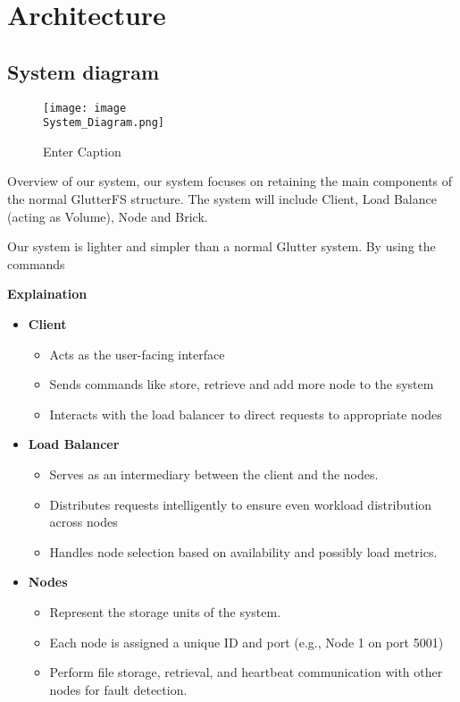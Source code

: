 \documentclass[a4paper,12pt]{article}
\begin{document}
\section{Architecture}
\subsection{System diagram}

\begin{figure}[htpd]
    \centering
    \texttt{[image: image\\System\_Diagram.png]}
    \caption{Enter Caption}
    \label{fig:enter-label}
\end{figure}

  Overview of our system, our system focuses on retaining the main components of the normal GlutterFS structure. The system will include Client, Load Balance (acting as Volume), Node and Brick.

Our system is lighter and simpler than a normal Glutter system. By using the commands

\textbf{Explaination}
\begin{itemize}
    \item\textbf{Client}
    \begin{itemize}
        \item Acts as the user-facing interface
        \item Sends commands like store, retrieve and add more node to the system
        \item Interacts with the load balancer to direct requests to appropriate nodes
    \end{itemize}

    \item\textbf{Load Balancer}
    \begin{itemize}
        \item Serves as an intermediary between the client and the nodes.
        \item Distributes requests intelligently to ensure even workload distribution across nodes
        \item Handles node selection based on availability and possibly load metrics.
    \end{itemize}
    
    \item\textbf{Nodes}
    \begin{itemize}
        \item Represent the storage units of the system.
        \item Each node is assigned a unique ID and port (e.g., Node 1 on port 5001)
        \item Perform file storage, retrieval, and heartbeat communication with other nodes for fault detection.
    \end{itemize}
\end{itemize}
\end{document}
